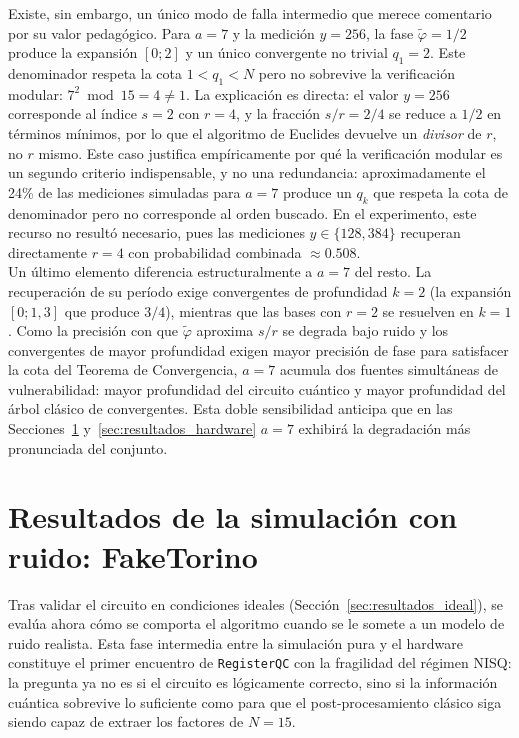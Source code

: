 \documentclass[12pt, spanish]{book}
\begin{document}
Existe, sin embargo, un único modo de falla intermedio que merece comentario por su valor pedagógico. Para $a = 7$ y la medición $y = 256$, la fase $\tilde{\varphi} = 1/2$ produce la expansión $[0; 2]$ y un único convergente no trivial $q_1 = 2$. Este denominador respeta la cota $1 < q_1 < N$ pero no sobrevive la verificación modular: $7^2 \bmod 15 = 4 \neq 1$. La explicación es directa: el valor $y = 256$ corresponde al índice $s = 2$ con $r = 4$, y la fracción $s/r = 2/4$ se reduce a $1/2$ en términos mínimos, por lo que el algoritmo de Euclides devuelve un \emph{divisor} de $r$, no $r$ mismo. Este caso justifica empíricamente por qué la verificación modular es un segundo criterio indispensable, y no una redundancia: aproximadamente el 24\% de las mediciones simuladas para $a = 7$ produce un $q_k$ que respeta la cota de denominador pero no corresponde al orden buscado. En el experimento, este recurso no resultó necesario, pues las mediciones $y \in \{128, 384\}$ recuperan directamente $r = 4$ con probabilidad combinada $\approx 0.508$.\\

Un último elemento diferencia estructuralmente a $a = 7$ del resto. La recuperación de su período exige convergentes de profundidad $k = 2$ (la expansión $[0; 1, 3]$ que produce $3/4$), mientras que las bases con $r = 2$ se resuelven en $k = 1$. Como la precisión con que $\tilde{\varphi}$ aproxima $s/r$ se degrada bajo ruido y los convergentes de mayor profundidad exigen mayor precisión de fase para satisfacer la cota del Teorema de Convergencia, $a = 7$ acumula dos fuentes simultáneas de vulnerabilidad: mayor profundidad del circuito cuántico y mayor profundidad del árbol clásico de convergentes. Esta doble sensibilidad anticipa que en las Secciones~\ref{sec:resultados_ruido} y~\ref{sec:resultados_hardware} $a = 7$ exhibirá la degradación más pronunciada del conjunto.

\section{Resultados de la simulación con ruido: FakeTorino}
\label{sec:resultados_ruido}

Tras validar el circuito en condiciones ideales (Sección~\ref{sec:resultados_ideal}), se evalúa ahora cómo se comporta el algoritmo cuando se le somete a un modelo de ruido realista. Esta fase intermedia entre la simulación pura y el hardware constituye el primer encuentro de \texttt{RegisterQC} con la fragilidad del régimen NISQ: la pregunta ya no es si el circuito es lógicamente correcto, sino si la información cuántica sobrevive lo suficiente como para que el post-procesamiento clásico siga siendo capaz de extraer los factores de $N = 15$.
\end{document}
